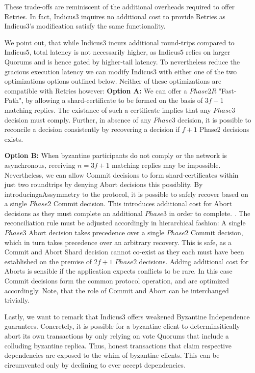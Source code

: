 These trade-offs are reminiscent of the additional overheads required to offer Retries. In fact, Indicus3 inquires no additional cost to provide Retries as Indicus3's modification satisfy the same functionality.

We point out, that while Indicus3 incurs additional round-trips compared to Indicus5, total latency is not necessarily higher, as Indicus5 relies on larger Quorums and is hence gated by higher-tail latency.
To nevertheless reduce the gracious execution latency we can modify Indicus3 with either one of the  two optimizations options outlined below. Neither of these optimizations are compatible with Retries however:
\textbf{Option A:} We can offer a $Phase2R$ "Fast-Path", by allowing a shard-certificate to be formed on the basis of $3f+1$ matching replies. The existance of such a certificate implies that any $Phase3$ decision must comply. Further, in absence of any $Phase3$ decision, it is possible to reconcile a decision consistently by recovering a decision if $f+1$ Phase2 decisions exists.

\textbf{Option B:} When byzantine participants do not comply or the network is asynchronous, receiving $n =3f+1$ matching replies may be impossible. Nevertheless, we can allow Commit decisions to form shard-certificates within just two roundtrips by denying Abort decisions this possiblity. By introducingaAssymmetry to the protocol, it is possible to safely recover based on a single $Phase2$ Commit decision. This introduces additional cost for Abort decisions as they must complete an additional $Phase3$ in order to complete. . The reconciliation rule must be adjusted accordingly in hierarchical fashion: A single $Phase3$ Abort decision takes precedence over a single $Phase2$ Commit decision, which in turn takes precedence over an arbitrary recovery. This is safe, as a Commit and Abort Shard decision cannot co-exist as they each must have been established on the premise of $2f+1$ $Phase2$ decisions. 
Adding additional cost for Aborts is sensible if the application expects conflicts to be rare. In this case Commit decisions form the common protocol operation, and are optimized accordingly. Note, that the role of Commit and Abort can be interchanged trivially.

Lastly, we want to remark that Indicus3 offers weakened Byzantine Independence guarantees. Concretely, it is possible for a byzantine client to determinsitically abort its own transactions by only relying on vote Quorums that include a colluding byzantine replica. Thus, honest transactions that claim respective dependencies are exposed to the whim of byzantine clients. This can be circumvented only by declining to ever accept dependencies.

